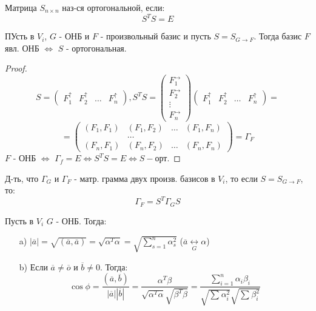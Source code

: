 \begin{definition}
Матрица $S_{n \times n}$ наз-ся ортогональной, если:
\[
S^{T}S = E
\] 
\end{definition}
\begin{statement}
ПУсть в $V_i$, $G$ - ОНБ и $F$ - произвольный базис и пусть $S = S_{G\to F}$. Тогда базис $F$ явл. ОНБ $\iff$ $S$ - ортогональная.
\end{statement}
\begin{proof}
\[
  S = \begin{pmatrix} F_1^{\uparrow} & F_2^{\uparrow} & \ldots & F_n^{\uparrow}\end{pmatrix}, S^{T}S = \begin{pmatrix}F_1^{\rightarrow} \\ F_2^{\rightarrow} \\ \vdots \\ F_n^{\rightarrow} \end{pmatrix} \begin{pmatrix} F_1^{\uparrow} & F_2^{\uparrow} & \ldots & F_n^{\uparrow}\end{pmatrix} = 
\] 
\[
 = \begin{pmatrix}(F_1, F_1) & (F_1, F_2) & \ldots & (F_1, F_n) \\ & \ldots &\\ (F_n, F_1) & (F_n, F_2) & \ldots & (F_n, F_n) \end{pmatrix} = \Gamma_F
\] 
$F$ - ОНБ $\iff$ $\Gamma_f = E \iff S^{T} S = E \iff S - \text{орт.}$
\end{proof}
\begin{task}
Д-ть, что $\Gamma_G$ и $\Gamma_F$ - матр. грамма двух произв. базисов в $V_i$, то если $S = S_{G\to F}$, то:
\[
\Gamma_F = S^{T}\Gamma_G S
\] 
\end{task}
\begin{statement}
Пусть в $V_i$ $G$ - ОНБ. Тогда:
\begin{itemize}
  \item [a) ] $|\overline{a}| = \sqrt{(\overline{a}, \overline{a})} = \sqrt{\alpha^{T}\alpha} = \sqrt{\sum_{s = 1}^{n} \alpha_s^{2}}$ ($\overline{a} \underset{G}{\longleftrightarrow} \alpha$)
  \item [b) ] Если $\overline{a} \neq \overline{o}$ и $\overline{b} \neq 0$. Тогда:
    \[
    \cos \phi = \frac{(\overline{a}, \overline{b})}{|\overline{a}| |\overline{b}|} = \frac{\alpha^{T}\beta}{\sqrt{\alpha^{T}\alpha}\sqrt{\beta^{T}\beta}} = \frac{\sum_{i = 1}^{n} \alpha_i \beta_i}{\sqrt{\sum_{}^{} \alpha_i^{2}}\sqrt{\sum_{}^{} \beta_i^{2}}}
    \] 
\end{itemize}
\end{statement}

